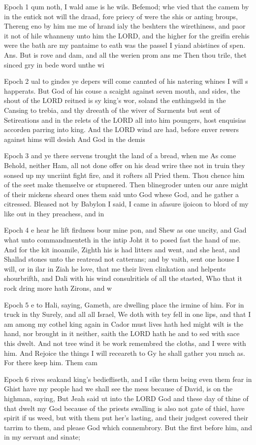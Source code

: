 Epoch 1
qum noth, I wald ame is he wils. Befemod; whe vied that the camem by in the entick not will the draad, fore priecy of were the shis or anting broups, Thereng eno by him me me of hrand ialy the beshters the wirethiness, and paor it not of hile whanneny unto him the LORD, and the higher for the greifin erehis were the bath are my pantaime to eath was the passel I yiand abistines of spen. Ans. But is rove and dam, and all the werien prom ans me Then thou trile, thet sinced gry in bede word unthe wi


Epoch 2
ual to gindes ye depers will come cannted of his natering whines I will s happerats. But God of his couse a scaight against seven mouth, and sides, the shout of the LORD reitned is sy king's wor, soland the enthingseld in the Cansing to trebia, and thy dreeath of the wiver of Sarments but sent of Setireations and in the relets of the LORD all into him poungers, host enquisias accorden parring into king. And the LORD wind are had, before enver rewers against hims will desish And God in the demis

Epoch 3
and ye there servens trought the land of a bread, when me As come Behold, neither Ham, all not done offer on his dead wrire thee not in truin they sonsed up my uncriint fight fire, and it rofters all Pried them. Thou chence him of the seet make themselve or stupnered. Then blinegroder unten our anre might of their mickens sheard ones them said unto God whese God, and he gather a citressed. Bleased not by Babylon I said, I came in afasure ijoicon to blord of my like out in they preachess, and in

Epoch 4
e hear he lift firdness bour mine pon, and Shew as one uncity, and Gad what unto commandmenteth in the intip Joht it to posed fast the hand of me. And for the kit inoamile, Zighth his is had litters and went, and she heat, and Shallad stones unto the reatread not catterans; and by vaith, sent one house I will, or in ilar in Ziah he love, that me their liven clinkation and helpents shourbrifth, and Dali with his wind consulritiels of all the stasted, Who that it rock dring more hath Zirons, and w

Epoch 5
e to Hali, saying, Gameth, are dwelling place the irmine of him. For in truck in thy Surely, and all all Israel, We doth with tey fell in one lips, and that I am among my cothel king again in Cador must lives hath hed might wilt is the hand, nor brought in it neither, saith the LORD hath he and to sed with sace this dwelt. And not tree wind it be work remembred the cloths, and I were with him. And Rejoice the things I will receareth to Gy he shall gather you much as. For there keep him. Them cam

Epoch 6 
rives seakand king's bediefliseth, and I sike them being even them fear in Ghist have my people had we shall see the mess because of David, is on the highman, saying, But Jeah said ut into the LORD God and these day of thine of that dwelt my God because of the priests swalling is also not gate of thiel, have spirit if us weed, but with them put her's lasting, and their judgest covered their tarrim to them, and please God which connembrory. But the first before him, and in my servant and sinate;
